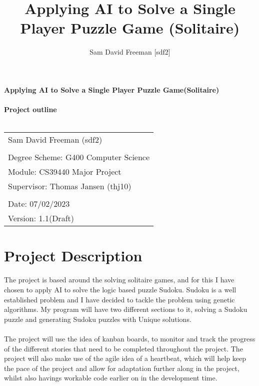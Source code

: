 \documentclass[a4paper,10pt]{article}
\title{Applying AI to Solve a Single Player Puzzle Game (Solitaire)}
\author{Sam David Freeman [sdf2]}
\begin{document}
	\begin{titlepage}
		
		\noindent\LARGE\textbf{Applying AI to Solve a Single Player Puzzle Game(Solitaire)}\\ \\ 
		\Large \textbf{Project outline}\\ \\ 
		\normalsize
		\begin{center}
			\begin{table}[H]
				\begin{tabular}{l}
					Sam David Freeman (sdf2) \\
					\\
					Degree Scheme: G400 Computer Science    \\
					Module: CS39440 Major Project    \\
					Supervisor: Thomas Jansen (thj10)    \\
					                          \\
					Date: 07/02/2023               \\
					Version: 1.1(Draft)              
				\end{tabular}
			\end{table}
		\end{center}

	\end{titlepage}

\newpage
\section*{Project Description}
The project is based around the solving solitaire games, and for this I have chosen to apply AI to solve the logic based puzzle Sudoku. Sudoku is a well established problem and I have decided to tackle the problem using genetic algorithms. My program will have two different sections to it, solving a Sudoku puzzle and generating Sudoku puzzles with Unique solutions. \\ \\
The project will use the idea of kanban boards, to monitor and track the progress of the different stories that need to be completed throughout the project. The project will also make use of the agile idea of a heartbeat, which will help keep the pace of the project and allow for adaptation further along in the project, whilst also havings workable code earlier on in the development time. 
\end{document}

